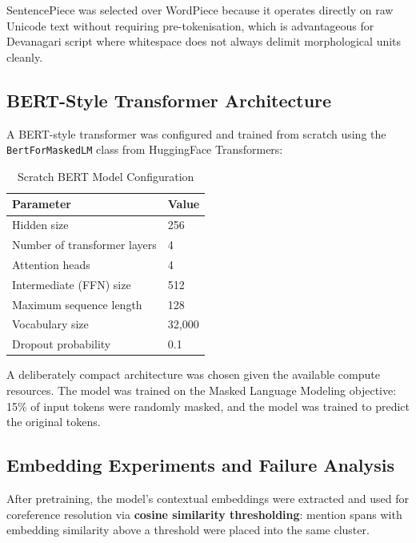 \documentclass[12pt,a4paper]{report}
\begin{document}
SentencePiece was selected over WordPiece because it operates directly on raw Unicode text without requiring pre-tokenisation, which is advantageous for Devanagari script where whitespace does not always delimit morphological units cleanly.

\subsection{BERT-Style Transformer Architecture}

A BERT-style transformer was configured and trained from scratch using the \texttt{BertForMaskedLM} class from HuggingFace Transformers:

\begin{table}[H]
\centering
\caption{Scratch BERT Model Configuration}
\begin{tabular}{|l|l|}
\hline
\textbf{Parameter} & \textbf{Value} \\
\hline
Hidden size & 256 \\
Number of transformer layers & 4 \\
Attention heads & 4 \\
Intermediate (FFN) size & 512 \\
Maximum sequence length & 128 \\
Vocabulary size & 32,000 \\
Dropout probability & 0.1 \\
\hline
\end{tabular}
\end{table}

\noindent A deliberately compact architecture was chosen given the available compute resources. The model was trained on the Masked Language Modeling objective: 15\% of input tokens were randomly masked, and the model was trained to predict the original tokens.

\subsection{Embedding Experiments and Failure Analysis}

After pretraining, the model's contextual embeddings were extracted and used for coreference resolution via \textbf{cosine similarity thresholding}: mention spans with embedding similarity above a threshold were placed into the same cluster.
\end{document}
